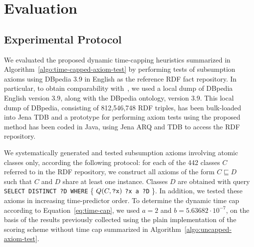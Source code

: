 \documentclass{sig-alternate}
\begin{document}
%
%



\section{Evaluation}%
\label{evaluation}

\subsection{Experimental Protocol}

We evaluated the proposed dynamic time-capping heuristics summarized in
Algorithm~\ref{algo:time-capped-axiom-test}
by performing tests of subsumption
axioms using DBpedia 3.9 in English as the reference RDF fact repository.
In particular, to obtain comparability with~\cite{TettamanziFaronZuckerGandon2014ekaw},
we used a local dump of DBpedia English version 3.9, along with the DBpedia ontology, version 3.9.
This local dump of DBpedia, consisting of 812,546,748 RDF triples,
has been bulk-loaded into Jena TDB and a prototype
for performing axiom tests using the proposed method has been coded in Java,
using Jena ARQ and TDB to access the RDF repository.

We systematically generated and tested subsumption axioms
involving atomic classes only, according the following protocol:
for each of the 442 classes $C$ referred to in the RDF repository,
we construct all axioms of the form $C \sqsubseteq D$ such that $C$ and $D$
share at least one instance. Classes $D$ are obtained with query
\texttt{SELECT DISTINCT ?D WHERE} \{ $Q(C, \mbox{\tt ?x})$ \texttt{?x a ?D} \}.
In addition, we tested these axioms in increasing time-predictor order.
To determine the dynamic time cap according to Equation~\ref{eq:time-cap},
we used $a = 2$ and $b = 5.63682\cdot 10^{-7}$, on the basis of the
results previously collected using the plain implementation of the scoring scheme
without time cap summarized in Algorithm~\ref{algo:uncapped-axiom-test}.
\end{document}
